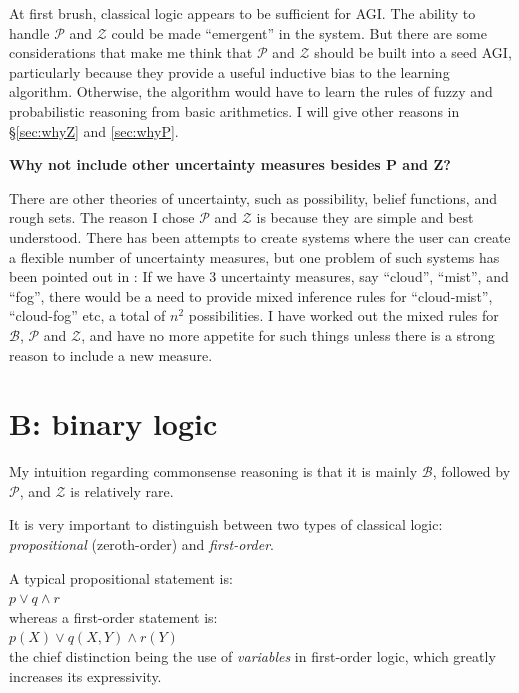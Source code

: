 At first brush, classical logic appears to be sufficient for AGI.  The ability to handle $\mathcal{P}$ and $\mathcal{Z}$ could be made ``emergent'' in the system.  But there are some considerations that make me think that $\mathcal{P}$ and $\mathcal{Z}$ should be built into a seed AGI, particularly because they provide a useful inductive bias to the learning algorithm.  Otherwise, the algorithm would have to learn the rules of fuzzy and probabilistic reasoning from basic arithmetics.  I will give other reasons in \S\ref{sec:whyZ} and \ref{sec:whyP}.

\textbf{Why not include other uncertainty measures besides P and Z?}

There are other theories of uncertainty, such as possibility, belief functions, and rough sets.  The reason I chose $\mathcal{P}$ and $\mathcal{Z}$ is because they are simple and best understood.  There has been attempts to create systems where the user can create a flexible number of uncertainty measures, but one problem of such systems has been pointed out in \citep*{Parsons2001}:  If we have 3 uncertainty measures, say ``cloud'', ``mist'', and ``fog'', there would be a need to provide mixed inference rules for ``cloud-mist'', ``cloud-fog'' etc, a total of $n^2$ possibilities.  I have worked out the mixed rules for $\mathcal{B}$, $\mathcal{P}$ and $\mathcal{Z}$, and have no more appetite for such things unless there is a strong reason to include a new measure.


\section{B: binary logic}
\label{sec:binary-logic}

My intuition regarding commonsense reasoning is that it is mainly $\mathcal{B}$, followed by $\mathcal{P}$, and $\mathcal{Z}$ is relatively rare.

It is very important to distinguish between two types of classical logic: \emph{propositional} (zeroth-order) and \emph{first-order}.

A typical propositional statement is:\\
\hspace*{1cm} $ p \vee q \wedge r $\\
whereas a first-order statement is:\\
\hspace*{1cm} $ p(X) \vee q(X,Y) \wedge r(Y) $\\
the chief distinction being the use of \emph{variables} in first-order logic, which greatly increases its expressivity.

